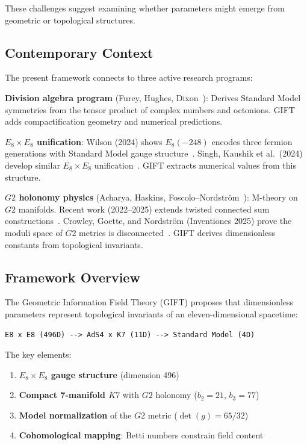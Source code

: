 \documentclass[11pt,a4paper]{article}
\newcommand{\E}{\mathrm{E}}
\newcommand{\Gtwo}{\mathrm{G}_2}
\newcommand{\Kseven}{K_7}
\def\Gtwo{G2}%
\def\Kseven{K7}%
\def\E{E}%
\begin{document}
These challenges suggest examining whether parameters might emerge from geometric or topological structures.

\subsection{Contemporary Context}

The present framework connects to three active research programs:

\textbf{Division algebra program} (Furey, Hughes, Dixon~\cite{furey2015,furey2022}): Derives Standard Model symmetries from the tensor product of complex numbers and octonions. GIFT adds compactification geometry and numerical predictions.

\textbf{$\E_8 \times \E_8$ unification}: Wilson (2024) shows $\E_8(-248)$ encodes three fermion generations with Standard Model gauge structure~\cite{wilson2024}. Singh, Kaushik et al.\ (2024) develop similar $\E_8 \times \E_8$ unification~\cite{singh2024}. GIFT extracts numerical values from this structure.

\textbf{$\Gtwo$ holonomy physics} (Acharya, Haskins, Foscolo--Nordstr\"om~\cite{acharya2004,foscolo2021,crowley2025}): M-theory on $\Gtwo$ manifolds. Recent work (2022--2025) extends twisted connected sum constructions~\cite{nordstrom2023,bera2025}. Crowley, Goette, and Nordstr\"om (Inventiones 2025) prove the moduli space of $\Gtwo$ metrics is disconnected~\cite{crowley2025}. GIFT derives dimensionless constants from topological invariants.

\subsection{Framework Overview}

The Geometric Information Field Theory (GIFT) proposes that dimensionless parameters represent topological invariants of an eleven-dimensional spacetime:

\begin{lstlisting}
E8 x E8 (496D) --> AdS4 x K7 (11D) --> Standard Model (4D)
\end{lstlisting}

The key elements:

\begin{enumerate}
\item \textbf{$\E_8 \times \E_8$ gauge structure} (dimension 496)
\item \textbf{Compact 7-manifold $\Kseven$} with $\Gtwo$ holonomy ($b_2 = 21$, $b_3 = 77$)
\item \textbf{Model normalization} of the $\Gtwo$ metric ($\det(g) = 65/32$)
\item \textbf{Cohomological mapping}: Betti numbers constrain field content
\end{enumerate}
\end{document}
